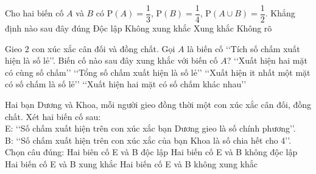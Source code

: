 \begin{ex}%
	Cho hai biến cố $A$ và $B$ có $\mathrm{P}(A)=\dfrac{1}{3}$,  $\mathrm{P}(B)=\dfrac{1}{4}$, $\mathrm{P}(A\cup B)=\dfrac{1}{2}$. Khẳng định nào sau đây đúng
	 \choice
		{Độc  lập}
		{\True Không xung khắc} 
		 {Xung khắc}
		{Không rõ} 
\end{ex}

\begin{ex}%
	Gieo $2$ con xúc xắc cân đối và đồng chất. Gọi  $A$ là biến cố \lq\lq Tích số chấm xuất hiện là số lẻ\rq\rq. Biến cố nào sau đây xung khắc với biến cố $A$?
	\choice 
		{\lq\lq Xuất hiện hai  mặt có cùng số chấm\rq\rq}
		{\True  \lq\lq Tổng số chấm xuất hiện là số lẻ\rq\rq}
		{\lq\lq Xuất hiện it nhất một mặt  có số chấm là số lẻ\rq\rq}
		{\lq\lq Xuất hiện hai  mặt có số chấm khác nhau\rq\rq}
\end{ex}

\begin{ex}%
	Hai bạn  Dương và Khoa, mỗi người gieo đồng thời một con xúc xắc cân đối, đồng chất. Xét hai biến cố sau:\\
	E: \lq\lq Số chấm xuất hiện trên con  xúc xắc bạn Dương gieo là số chính phương\rq\rq .\\
	B: \lq\lq Số chấm xuất hiện trên con xúc xắc của bạn  Khoa là số chia hết cho 4\rq\rq .\\
	Chọn  câu đúng:
	\choice 
		{\True Hai biên cố E  và B độc lập}
		{Hai biến cố E và B không độc  lập}
		{Hai biến cố E và  B xung khắc}
		{Hai biến cố E và B không  xung khắc}
\end{ex}

